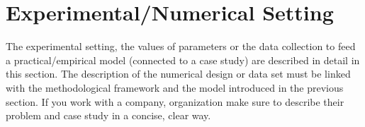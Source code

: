 \section{Experimental/Numerical Setting}
    The experimental setting, the values of parameters or the data collection to feed a practical/empirical model (connected to a case study) are described in detail in this section. The description of the numerical design or data set must be linked with the methodological framework and the model introduced in the previous section. If you work with a company, organization make sure to describe their problem and case study in a concise, clear way.